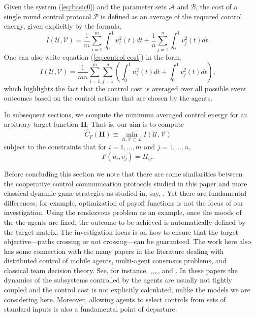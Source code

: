\documentclass[12pt,onecolumn,draftcls]{IEEEtran}
\newcommand{\cA}{\mathcal{A}}
\newcommand{\cB}{\mathcal{B}}
\begin{document}
Given the system (\ref{eq:basic0}) and the parameter sets $\cA$ and $\cB$, the cost of a single round control protocol $\mathcal{P}$ is
defined as an average of the required control energy, given explicitly by the formula,
\begin{equation}
I(\mathcal{U},\mathcal{V})=
\dfrac{1}{m}\sum_{i=1}^m \int_0^1 u_i^2(t)dt + \dfrac{1}{n}\sum_{j=1}^n \int_0^1 v_j^2(t)dt.
\label{eq:control cost}
\end{equation}
One can also write equation (\ref{eq:control cost}) in the form,
\begin{equation}
I(\mathcal{U},\mathcal{V})=
\dfrac{1}{mn}\sum_{i=1}^m \sum_{j=1}^n \left( \int_0^1 u_i^2(t)dt + \int_0^1 v_j^2(t)dt \right),
\label{eq:control cost2}
\end{equation}
which highlights the fact that the control cost is averaged over all possible event outcomes based on the control actions that are chosen by the agents.

In subsequent sections, we compute the minimum averaged control energy for an arbitrary target function $\mathbf{H}$.
That is, our aim is to compute
\begin{equation}
\hat{C}_F(\mathbf{H}) \equiv \min_{\mathcal{U}, \mathcal{V} \subset \mathcal{L}}  I(\mathcal{U},\mathcal{V})
\end{equation}
subject to the constraints that for $i=1, \ldots, m$ and $j=1, \ldots, n$,
\begin{equation}
F(u_i, v_j) = H_{ij}.
\end{equation}

Before concluding this section we note that there are some similarities between the cooperative control communication protocols studied in this paper and more classical dynamic game strategies as studied in, say,  \cite{BO}.  Yet there are fundamental differences; for example, optimization of payoff functions is not the focus of our investigation.
Using the rendezvous problem as an example, once the moods of the the agents are fixed, the outcome to be achieved is
automatically defined by the target matrix.  The investigation focus is on how to ensure that the target objective---paths crossing or not crossing---can be guaranteed.  The work here also has some connection with the many papers in the literature
dealing with distributed control of mobile agents, multi-agent  consensus problems, and classical team decision theory.  See,  for instance,
 \cite{CB},\cite{CMB},\cite{DM},\cite{FM},\cite{YCHo}, and \cite{OM}.  In these papers the dynamics of the subsystems controlled by the agents are usually not tightly coupled
and the control cost is not explicitly calculated, unlike the models we are considering here.  Moreover, allowing agents to select controls from sets of standard inputs is also a fundamental point of departure.
\end{document}
